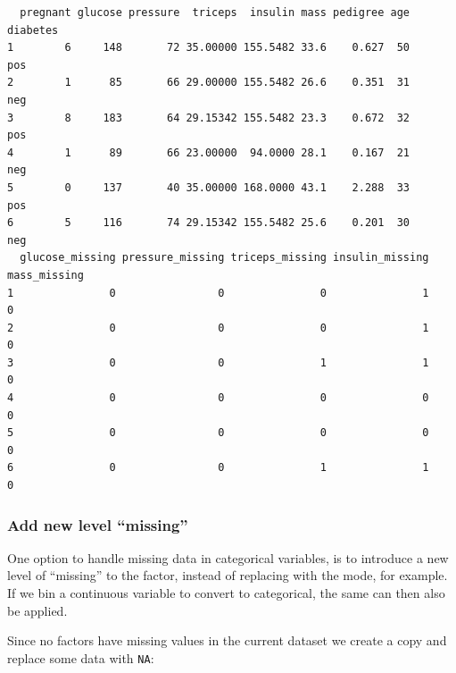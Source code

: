 \documentclass[
]{book}
\newenvironment{Shaded}{\begin{snugshade}}{\end{snugshade}}
\newcommand{\ConstantTok}[1]{\textcolor[rgb]{0.00,0.00,0.00}{#1}}
\newcommand{\DecValTok}[1]{\textcolor[rgb]{0.00,0.00,0.81}{#1}}
\newcommand{\FunctionTok}[1]{\textcolor[rgb]{0.00,0.00,0.00}{#1}}
\newcommand{\NormalTok}[1]{#1}
\newcommand{\OtherTok}[1]{\textcolor[rgb]{0.56,0.35,0.01}{#1}}
\newcommand{\SpecialCharTok}[1]{\textcolor[rgb]{0.00,0.00,0.00}{#1}}
\begin{document}
\begin{verbatim}
  pregnant glucose pressure  triceps  insulin mass pedigree age diabetes
1        6     148       72 35.00000 155.5482 33.6    0.627  50      pos
2        1      85       66 29.00000 155.5482 26.6    0.351  31      neg
3        8     183       64 29.15342 155.5482 23.3    0.672  32      pos
4        1      89       66 23.00000  94.0000 28.1    0.167  21      neg
5        0     137       40 35.00000 168.0000 43.1    2.288  33      pos
6        5     116       74 29.15342 155.5482 25.6    0.201  30      neg
  glucose_missing pressure_missing triceps_missing insulin_missing mass_missing
1               0                0               0               1            0
2               0                0               0               1            0
3               0                0               1               1            0
4               0                0               0               0            0
5               0                0               0               0            0
6               0                0               1               1            0
\end{verbatim}

\hypertarget{add-new-level-missing}{%
\subsubsection{Add new level ``missing''}\label{add-new-level-missing}}

One option to handle missing data in categorical variables, is to introduce a new level of ``missing'' to the factor, instead of replacing with the mode, for example. If we bin a continuous variable to convert to categorical, the same can then also be applied.

Since no factors have missing values in the current dataset we create a copy and replace some data with \texttt{NA}:

\begin{Shaded}
\end{Shaded}
\end{document}
